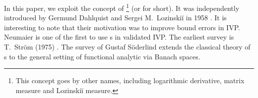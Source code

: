 In this paper, we exploit the concept
	of \footnote{
		This concept goes by other names, including
			{logarithmic derivative},
			{matrix measure} and
			{Lozinski\u{i} measure}.
	}
	(or \dt{\lognorm} for short). It was independently introduced
	by Germund Dahlquist and Sergei M.~Lozinski\u{i} in 1958
	\cite{soderlind:log-norm-history}.
	It is interesting to note that their motivation
	was to improve bound errors in IVP.
	Neumaier \cite{neumaier:theoryI:94}
	is one of the first to use \lognorm s in validated IVP.
	The earliest survey is
	T.~Str\"om (1975) \cite{strom:log-norm:75}.
	The survey of Gustaf S\"{o}derlind
	\cite{soderlind:log-norm-history}
	extends the classical theory of \lognorm s to the general
	setting of {functional analytic} via Banach spaces.

	

%
%	


